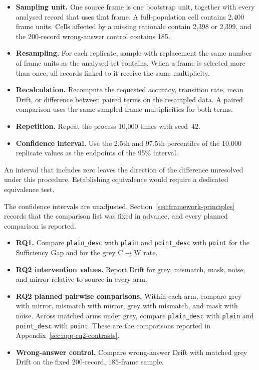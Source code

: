 \begin{itemize}
  \item \textbf{Sampling unit.} One source frame is one bootstrap unit, together
        with every analysed record that uses that frame. A full-population cell
        contains 2,400 frame units. Cells affected by a missing rationale contain
        2,398 or 2,399, and the 200-record wrong-answer control contains 185.

  \item \textbf{Resampling.} For each replicate, sample with replacement the
        same number of frame units as the analysed set contains. When a frame is
        selected more than once, all records linked to it receive the same
        multiplicity.

  \item \textbf{Recalculation.} Recompute the requested accuracy, transition
        rate, mean Drift, or difference between paired terms on the resampled
        data. A paired comparison uses the same sampled frame multiplicities for
        both terms.

  \item \textbf{Repetition.} Repeat the process 10,000 times with seed~42.

  \item \textbf{Confidence interval.} Use the 2.5th and 97.5th percentiles of
        the 10,000 replicate values as the endpoints of the 95\% interval.
\end{itemize}

An interval that includes zero leaves the direction of the difference unresolved
under this procedure. Establishing equivalence would require a dedicated
equivalence test.

The confidence intervals are unadjusted.
Section~\ref{sec:framework-principles} records that the comparison list was
fixed in advance, and every planned comparison is reported.

\begin{itemize}
  \item \textbf{RQ1.} Compare \texttt{plain\_desc} with \texttt{plain} and
        \texttt{point\_desc} with \texttt{point} for the Sufficiency Gap and for
        the grey C$\rightarrow$W rate.

  \item \textbf{RQ2 intervention values.} Report Drift for grey, mismatch, mask,
        noise, and mirror relative to source in every arm.

  \item \textbf{RQ2 planned pairwise comparisons.} Within each arm, compare grey
        with mirror, mismatch with mirror, grey with mismatch, and mask with
        noise. Across matched arms under grey, compare \texttt{plain\_desc} with
        \texttt{plain} and \texttt{point\_desc} with \texttt{point}. These are
        the comparisons reported in
        Appendix~\ref{sec:app-rq2-contrasts}.

  \item \textbf{Wrong-answer control.} Compare wrong-answer Drift with matched
        grey Drift on the fixed 200-record, 185-frame sample.
\end{itemize}

